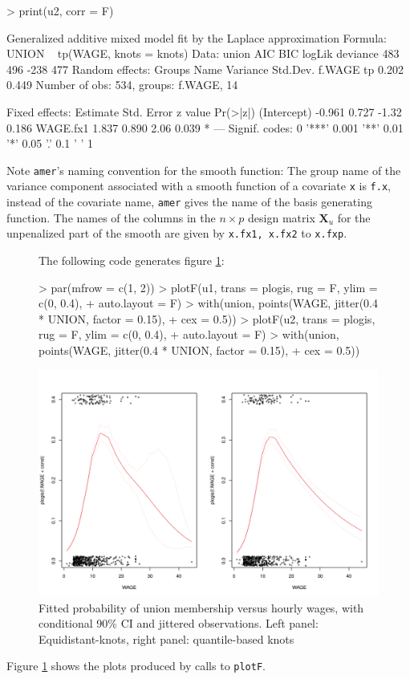 \documentclass[12pt]{article}
\newenvironment{Schunk}{}{}
\newcommand{\code}[1]{\texttt{\small{#1}}}
\begin{document}
\begin{Schunk}
\begin{Sinput}
> print(u2, corr = F)
\end{Sinput}
\begin{Soutput}
Generalized additive mixed model fit by the Laplace approximation 
Formula: UNION ~ tp(WAGE, knots = knots) 
   Data: union 
 AIC BIC logLik deviance
 483 496   -238      477
Random effects:
 Groups Name Variance Std.Dev.
 f.WAGE tp   0.202    0.449   
Number of obs: 534, groups: f.WAGE, 14

Fixed effects:
            Estimate Std. Error z value Pr(>|z|)  
(Intercept)   -0.961      0.727   -1.32    0.186  
WAGE.fx1       1.837      0.890    2.06    0.039 *
---
Signif. codes:  0 '***' 0.001 '**' 0.01 '*' 0.05 '.' 0.1 ' ' 1 
\end{Soutput}
\end{Schunk}
Note \code{amer}'s naming convention for the smooth function: The group name of
the variance component associated with a smooth function of a covariate \code{x}
is \code{f.x}, instead of the covariate name, \code{amer} gives the name of the
basis generating function. The names of the columns in the $n \times p$ design
matrix $\bm X_u$ for the unpenalized part of the smooth are given by \code{x.fx1,
x.fx2} to \code{x.fxp}.
\begin{figure}[!htbp]
The following code generates figure \ref{unionPlot}:
\begin{center}
\begin{Schunk}
\begin{Sinput}
> par(mfrow = c(1, 2))
> plotF(u1, trans = plogis, rug = F, ylim = c(0, 0.4), 
+     auto.layout = F)
> with(union, points(WAGE, jitter(0.4 * UNION, factor = 0.15), 
+     cex = 0.5))
> plotF(u2, trans = plogis, rug = F, ylim = c(0, 0.4), 
+     auto.layout = F)
> with(union, points(WAGE, jitter(0.4 * UNION, factor = 0.15), 
+     cex = 0.5))
\end{Sinput}
\end{Schunk}
\includegraphics{GAMMsUsingLME4-unionPlot}
\caption{Fitted probability of union membership versus hourly wages, 
with conditional 90\% CI and jittered observations.
Left panel: Equidistant-knots, right panel: quantile-based knots \label{unionPlot}}                    
\end{center}
\end{figure}
Figure \ref{unionPlot} shows the plots produced by calls to \code{plotF}.
\end{document}

